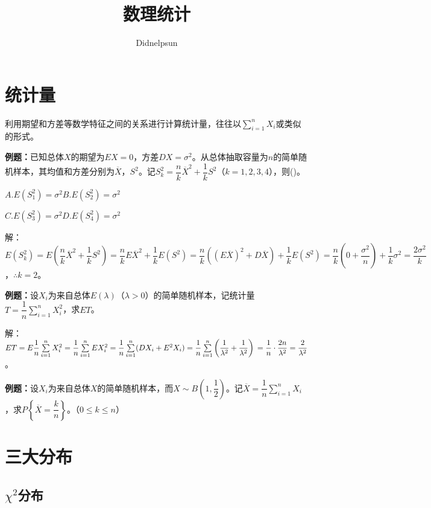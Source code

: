 \documentclass[UTF8, 12pt]{ctexart}
\author{Didnelpsun}
\title{数理统计}
\date{}
\begin{document}
\maketitle
\pagestyle{empty}
\thispagestyle{empty}
\tableofcontents
\thispagestyle{empty}
\newpage
\pagestyle{plain}
\setcounter{page}{1}
\section{统计量}

利用期望和方差等数学特征之间的关系进行计算统计量，往往以$\sum\limits_{i=1}^nX_i$或类似的形式。

\textbf{例题：}已知总体$X$的期望为$EX=0$，方差$DX=\sigma^2$。从总体抽取容量为$n$的简单随机样本，其均值和方差分别为$\overline{X}$，$S^2$。记$S_k^2=\dfrac{n}{k}\overline{X}^2+\dfrac{1}{k}S^2$（$k=1,2,3,4$），则()。

$A.E(S_1^2)=\sigma^2$\qquad$B.E(S_2^2)=\sigma^2$

$C.E(S_3^2)=\sigma^2$\qquad$D.E(S_4^2)=\sigma^2$

解：$E(S_k^2)=E\left(\dfrac{n}{k}\overline{X}^2+\dfrac{1}{k}S^2\right)=\dfrac{n}{k}E\overline{X}^2+\dfrac{1}{k}E(S^2)=\dfrac{n}{k}((E\overline{X})^2+D\overline{X})+\dfrac{1}{k}E(S^2)=\dfrac{n}{k}\left(0+\dfrac{\sigma^2}{n}\right)+\dfrac{1}{k}\sigma^2=\dfrac{2\sigma^2}{k}$，$\therefore k=2$。

\textbf{例题：}设$X_i$为来自总体$E(\lambda)$（$\lambda>0$）的简单随机样本，记统计量$T=\dfrac{1}{n}\sum\limits_{i=1}^nX_i^2$，求$ET$。

解：$ET=E\dfrac{1}{n}\sum\limits_{i=1}^nX_i^2=\dfrac{1}{n}\sum\limits_{i=1}^nEX_i^2=\dfrac{1}{n}\sum\limits_{i=1}^n(DX_i+E^2X_i)=\dfrac{1}{n}\sum\limits_{i=1}^n\left(\dfrac{1}{\lambda^2}+\dfrac{1}{\lambda^2}\right)\\=\dfrac{1}{n}\cdot\dfrac{2n}{\lambda^2}=\dfrac{2}{\lambda^2}$。

\textbf{例题：}设$X_i$为来自总体$X$的简单随机样本，而$X\sim B\left(1,\dfrac{1}{2}\right)$。记$\overline{X}=\dfrac{1}{n}\sum\limits_{i=1}^nX_i$，求$P\left\{\overline{X}=\dfrac{k}{n}\right\}$。（$0\leqslant k\leqslant n$）

\section{三大分布}

\subsection{\texorpdfstring{$\chi^2$分布}{}}
\end{document}
